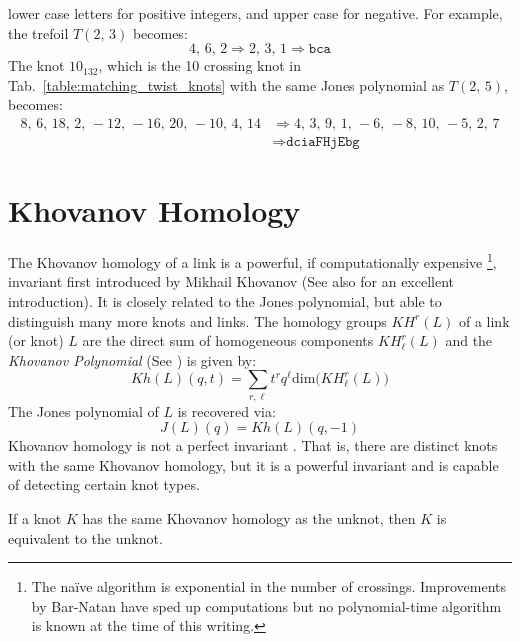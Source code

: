     lower case letters for positive integers, and upper case for negative.
    For example, the trefoil $T(2,\,3)$ becomes:
    \begin{equation}
        4,\,6,\,2
        \Rightarrow
        2,\,3,\,1
        \Rightarrow
        \texttt{bca}
    \end{equation}
    The knot $10_{132}$, which is the 10 crossing knot in
    Tab.~\ref{table:matching_twist_knots} with the same Jones polynomial
    as $T(2,\,5)$, becomes:
    \begin{align}
        8,\,6,\,18,\,2,\,-12,\,-16,\,20,\,-10,\,4,\,14
        &\Rightarrow
        4,\,3,\,9,\,1,\,-6,\,-8,\,10,\,-5,\,2,\,7\\
        &\Rightarrow
        \texttt{dciaFHjEbg}
    \end{align}
\section{Khovanov Homology}
    The Khovanov homology of a link is a powerful, if computationally
    expensive%
    \footnote{%
        The na\"{i}ve algorithm is exponential in the number of
        crossings. Improvements by Bar-Natan \cite{BarNatanFastKhoHo}
        have sped up computations but no polynomial-time algorithm is
        known at the time of this writing.
    },
    invariant first introduced by Mikhail Khovanov
    \cite{Khovanov1999CatJonesPoly} (See also \cite{barnatan2002khovanov}
    for an excellent introduction). It is closely related to the Jones
    polynomial, but able to distinguish many more knots and links. The
    homology groups $KH^{r}(L)$ of a link (or knot) $L$ are the direct sum
    of homogeneous components $KH_{\ell}^{r}(L)$ and the
    \textit{Khovanov Polynomial} (See \cite{KatlasKhoHo}) is given by:
    \begin{equation}
        Kh(L)(q,t)=
        \sum_{r,\ell}t^{r}q^{\ell}\textrm{dim}\big(KH_{\ell}^{r}(L)\big)
    \end{equation}
    The Jones polynomial of $L$ is recovered via:
    \begin{equation}
        J(L)(q)=Kh(L)(q,-1)
    \end{equation}
    Khovanov homology is not a perfect invariant
    \cite{Watson2007KnotsWI}. That is, there are
    distinct knots with the same Khovanov homology, but it is a powerful
    invariant and is capable of detecting certain knot types.
    \begin{theorem}
        If a knot $K$ has the same Khovanov homology as the unknot, then $K$
        is equivalent to the unknot.
    \end{theorem}
